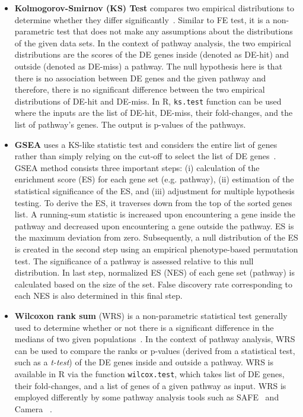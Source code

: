 \documentclass[Minh_PhD_thesis.tex]{subfiles}
\begin{document}
\begin{itemize}

\item \textbf{Kolmogorov-Smirnov (KS) Test} compares two empirical distributions to determine whether they differ significantly~\cite{wilcoxon1945individual}.
Similar to FE test, it is a non-parametric test that does not make any assumptions about the distributions of the given data sets.
In the context of pathway analysis, the two empirical distributions are the scores of the DE genes inside (denoted as DE-hit) and outside (denoted as DE-miss) a pathway.
The null hypothesis here is that there is no association between DE genes and the given pathway and therefore, there is no significant difference between the two empirical distributions of DE-hit and DE-miss.
In R, \texttt{ks.test} function can be used where the inputs are the list of DE-hit, DE-miss, their fold-changes, and the list of pathway's genes.
The output is p-values of the pathways.

\item \textbf{GSEA} uses a KS-like statistic test and considers the entire list of genes rather than simply relying on the cut-off to select the list of DE genes~\cite{Subramanian:2005}. 
GSEA method consists three important steps: (i) calculation of the enrichment score (ES) for each gene set (e.g. pathway), (ii) estimation of the statistical significance of the ES, and (iii) adjustment for multiple hypothesis testing.
To derive the ES, it traverses down from the top of the sorted genes list.
A running-sum statistic is increased upon encountering a gene inside the pathway and decreased upon encountering a gene outside the pathway. 
ES is the maximum deviation from zero.
Subsequently, a null distribution of the ES is created in the second step using an empirical phenotype-based permutation test.
The significance of a pathway is assessed relative to this null distribution.
In last step, normalized ES (NES) of each gene set (pathway) is calculated based on the size of the set.
False discovery rate corresponding to each NES is also determined in this final step.

\item  \textbf{Wilcoxon rank sum} (WRS) is a non-parametric statistical test generally used to determine whether or not there is a significant difference in the medians of two given populations~\cite{wilcoxon1945individual}.
In the context of pathway analysis, WRS can be used to compare the ranks or p-values (derived from a statistical test, such as a \textit{t-test}) of the DE genes inside and outside a pathway.
WRS is available in R via the function \texttt{wilcox.test}, which takes list of DE genes, their fold-changes, and a list of genes of a given pathway as input.
WRS is employed differently by some pathway analysis tools such as SAFE~\cite{Barry:2005} and Camera ~\cite{wu2012camera}.



\end{itemize}
\end{document}
